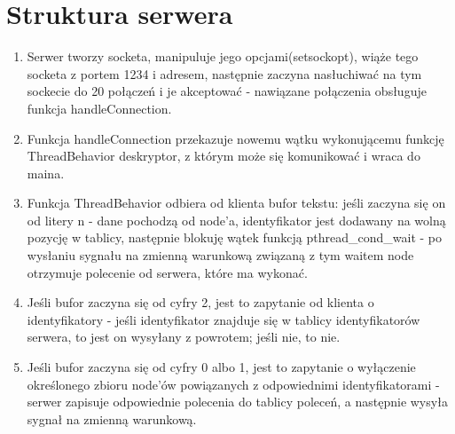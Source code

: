 \documentclass[12pt]{article}
\begin{document}
\section{Struktura serwera}
\begin {enumerate}
	\item Serwer tworzy socketa, manipuluje jego opcjami(setsockopt), wiąże tego socketa z portem 1234 i adresem, następnie zaczyna nasłuchiwać na tym sockecie do 20 połączeń i je akceptować - nawiązane połączenia obsługuje funkcja handleConnection.
	\item Funkcja handleConnection przekazuje nowemu wątku wykonującemu funkcję ThreadBehavior deskryptor, z którym może się komunikować i wraca do maina.
	\item Funkcja ThreadBehavior odbiera od klienta bufor tekstu: jeśli zaczyna się on od litery n - dane pochodzą od node'a, identyfikator jest dodawany na wolną pozycję w tablicy, następnie blokuję wątek funkcją pthread\_cond\_wait - po wysłaniu sygnału na zmienną warunkową związaną z tym waitem node otrzymuje polecenie od serwera, które ma wykonać.
	 \item Jeśli bufor zaczyna się od cyfry 2, jest to zapytanie od klienta o identyfikatory - jeśli identyfikator znajduje się w tablicy identyfikatorów serwera, to jest on wysyłany z powrotem; jeśli nie, to nie.
	 \item Jeśli bufor zaczyna się od cyfry 0 albo 1, jest to zapytanie o wyłączenie określonego zbioru node'ów powiązanych z odpowiednimi identyfikatorami - serwer zapisuje odpowiednie polecenia do tablicy poleceń, a następnie wysyła sygnał na zmienną warunkową.
	 
\end {enumerate}
\end{document}
